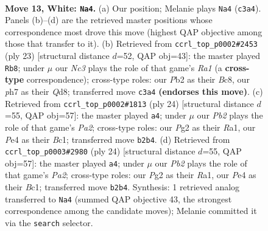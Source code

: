 \documentclass[11pt]{article}
\begin{document}
\begin{figure}[p]\centering
\begin{subfigure}{0.46\textwidth}\centering
\resizebox{\linewidth}{!}{%
\newchessgame
\chessboard[
  setfen={r1b2rk1/ppp2p1p/3p1qp1/4b2n/2P1P3/2NB3P/PP1Q1PP1/R1B2RK1 w - - 5 13},
  showmover=false,
  pgfstyle=straightmove, color=movearrow, markmove={c3-a4}
]}
\caption{}
\end{subfigure}\hfill
\begin{subfigure}{0.46\textwidth}\centering
\resizebox{\linewidth}{!}{%
\newchessgame
\chessboard[
  setfen={r1bqnrk1/3pbppp/p7/1pp1P3/4Q3/1B6/PPP2PPP/RNB1R1K1 b - - 1 12},
  showmover=false,
  pgfstyle=straightmove, color=movearrow, markmove={a8-b8}
]}
\caption{}
\end{subfigure}
\\[4pt]
\begin{subfigure}{0.46\textwidth}\centering
\resizebox{\linewidth}{!}{%
\newchessgame
\chessboard[
  setfen={r3k2r/p2n1ppp/2p1bq2/1pb1p3/4P3/3BN3/PPP1QPPP/R1B2RK1 w kq - 4 13},
  showmover=false,
  pgfstyle=straightmove, color=movearrow, markmove={a2-a4}
]}
\caption{}
\end{subfigure}\hfill
\begin{subfigure}{0.46\textwidth}\centering
\resizebox{\linewidth}{!}{%
\newchessgame
\chessboard[
  setfen={r3k2r/p2n1ppp/2p1bq2/1pb1p3/4P3/3BN3/PPP1QPPP/R1B2RK1 w kq - 4 13},
  showmover=false,
  pgfstyle=straightmove, color=movearrow, markmove={a2-a4}
]}
\caption{}
\end{subfigure}
\caption{\textbf{Move 13, White: \texttt{Na4}.} (a) Our position; Melanie plays \texttt{Na4} (\texttt{c3a4}). Panels (b)--(d) are the retrieved master positions whose correspondence most drove this move (highest QAP objective among those that transfer to it). (b) Retrieved from \texttt{ccrl\_top\_p0002\#2453} (ply 23) [structural distance $d$=52, QAP obj=43]: the master played \texttt{Rb8}; under $\mu$ our \emph{Nc3} plays the role of that game's \emph{Ra1} (a \textbf{cross-type} correspondence); cross-type roles: our \emph{P}b2 as their \emph{B}c8, our \emph{p}h7 as their \emph{Q}d8; transferred move \texttt{c3a4} \textbf{(endorses this move)}. (c) Retrieved from \texttt{ccrl\_top\_p0002\#1813} (ply 24) [structural distance $d$=55, QAP obj=57]: the master played \texttt{a4}; under $\mu$ our \emph{Pb2} plays the role of that game's \emph{Pa2}; cross-type roles: our \emph{P}g2 as their \emph{R}a1, our \emph{P}e4 as their \emph{B}c1; transferred move \texttt{b2b4}. (d) Retrieved from \texttt{ccrl\_top\_p0003\#2980} (ply 24) [structural distance $d$=55, QAP obj=57]: the master played \texttt{a4}; under $\mu$ our \emph{Pb2} plays the role of that game's \emph{Pa2}; cross-type roles: our \emph{P}g2 as their \emph{R}a1, our \emph{P}e4 as their \emph{B}c1; transferred move \texttt{b2b4}. Synthesis: 1 retrieved analog transferred to \texttt{Na4} (summed QAP objective 43, the strongest correspondence among the candidate moves); Melanie committed it via the \texttt{search} selector.}
\label{fig:thought-m24}
\end{figure}
\end{document}

